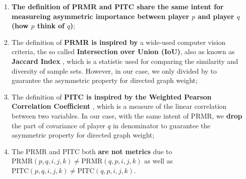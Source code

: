\begin{enumerate}
\item \textbf{The definition of PRMR and PITC share the same intent for measureing asymmetric importance  
      between player $p$ and player $q$ (how $p$ think of $q$)};
\item The definition of \textbf{PRMR is inspired by} a wide-used computer vision criteria, the so called \textbf{Intersection over Union (IoU)}, 
      also as known as \textbf{Jaccard Index} \cite{real1996probabilistic, jaccard1901etude},
      which is a statistic used for comparing the similarity and diversity of sample sets. 
      However, in our case, we only divided by to guarantee the asymmetric property for directed graph weight;
\item The definition of \textbf{PITC is inspired by the Weighted Pearson Correlation Coefficient} \cite{pearson1895note},
      which is a measure of the linear correlation between two variables. In our case, with the same intent of PRMR, 
      we \textbf{drop} the
      part of covariance of player $q$ in denominator to guarantee the asymmetric property for directed graph weight; 
\item The PRMR and PITC both \textbf{are not metrics} due to $\text{PRMR}(p, q, i, j, k) \neq \text{PRMR}(q, p, i, j, k)$ as well as
$\text{PITC}(p, q, i, j, k) \neq \text{PITC}(q, p, i, j, k)$.
\end{enumerate}

